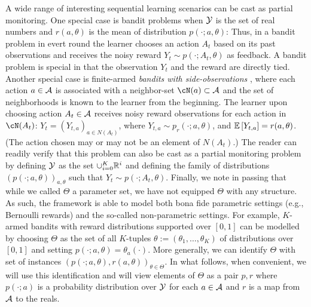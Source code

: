 A wide range of interesting sequential learning scenarios can be cast as partial monitoring.
One special case is bandit problems when $\mathcal{Y}$ is the set of real numbers and $r(a,\theta)$
is the mean of distribution $p(\cdot;a,\theta)$: 
Thus, in a bandit problem in evert round the learner chooses an action $A_t$ based on its past observations
and receives the noisy reward $Y_t \sim p(\cdot;A_t,\theta)$ as feedback. 
A bandit problem is special in that the observation $Y_t$ and the reward are directly tied.
Another special case is finite-armed  \emph{bandits with side-observations} \citet{MaSh11},
where each action $a\in \mathcal{A}$ is associated with a neighbor-set $\cN(a)\subset \A$ and
the set of neighborhoods is known to the learner from the beginning.
The learner upon choosing action $A_t\in \mathcal{A}$ receives noisy reward observations for each action in $\cN(A_t)$:
$Y_t  = (Y_{t,a})_{a\in N(A_t)}$, where $Y_{t,a} \sim p_r(\cdot;a,\theta)$, and $\mathbb{E}\left[Y_{t,a}\right] = r(a,\theta)$.
(The action chosen may or may not be an element of $N(A_t)$.)
The reader can readily verify that this problem can also be cast as a partial monitoring problem
by defining $\mathcal{Y}$ as the set $\cup_{i=0}^K \mathbb{R}^i$ and defining 
the family of distributions $(p(\cdot;a,\theta))_{a,\theta}$ such that $Y_t \sim p(\cdot;A_t,\theta)$.
Finally, we note in passing that while we called $\Theta$ a parameter set, 
we have not equipped $\Theta$ with any structure. As such,
the framework is able to model both bona fide parametric settings (e.g., Bernoulli rewards) and 
the so-called non-parametric settings. For example, $K$-armed bandits with reward distributions supported
over $[0,1]$ can be modelled by choosing $\Theta$ as the set of all $K$-tuples 
$\theta:=(\theta_1,\dots,\theta_K)$ of distributions over $[0,1]$ and setting $p(\cdot;a,\theta) = \theta_a(\cdot)$.
More generally, we can identify $\Theta$ with set of instances $(p(\cdot;a,\theta),r(a,\theta))_{\theta\in \Theta}$.
In what follows, when convenient, we will use this identification and will view elements of $\Theta$ as a pair $p,r$ 
where $p(\cdot;a)$ is a probability distribution over $\mathcal{Y}$ for each $a\in \mathcal{A}$ and $r$ is a map from $\mathcal{A}$ to the reals.
